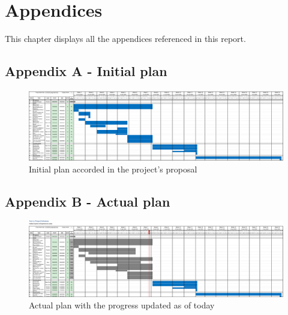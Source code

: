 %
%

\chapter{Appendices}

This chapter displays all the appendices referenced in this report.

\begin{landscape}
    \appendix    
    \section*{Appendix A - Initial plan}
    \label{app:initial_plan}
    \vspace{20mm}
    \begin{figure}[H]        
        \includegraphics[scale=0.3]{_figures/Project_initial_plan.eps}
        \caption{Initial plan accorded in the project's proposal}
    \end{figure}  
\end{landscape}

\begin{landscape}    
    \appendix
    \section*{Appendix B - Actual plan}
    \label{app:actual_plan}
    \vspace{20mm}
    \begin{figure}[H]        
        \includegraphics[scale=0.3]{_figures/Project_actual_plan.eps}        
        \caption{Actual plan with the progress updated as of today}
    \end{figure}  
\end{landscape}

\appendix


\begin{landscape}
    \appendix
    
\end{landscape}

